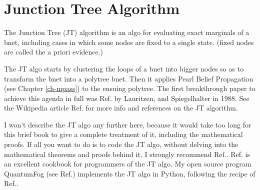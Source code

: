 \chapter{Junction Tree Algorithm}
\label{ch-junc-tree}
The Junction Tree (JT)
algorithm
is an algo
for evaluating
exact marginals
of a bnet, 
including cases in which
some nodes are fixed to a single state.
(fixed nodes
are called the a priori evidence.)

The JT algo
starts by  
clustering
the loops of a bnet into bigger nodes
so as  to
transform the bnet into a polytree bnet.
Then it applies
Pearl Belief Propagation (see
Chapter \ref{ch-mpass}) to the ensuing polytree.
The first breakthrough 
paper to achieve this agenda in full
was Ref.\cite{lauritzen1988}
by Lauritzen, and Spiegelhalter in 1988.
See the Wikipedia article 
Ref.\cite{wiki-junc-tree}
for more info and
 references on the JT algorithm. 

I won't describe
the JT algo
any further here,
because it would take too
long for this brief book
to give a complete treatment
of it, including the mathematical proofs.
If all you want to do is to
code the JT algo, without
delving into the mathematical theorems
and proofs behind it, I 
strongly recommend 
Ref.\cite{huang1996}.
Ref.\cite{huang1996} is 
an excellent cookbook
for programmers of the JT algo. My
open source  
program QuantumFog (see Ref.\cite{qfog})
implements the
JT algo in Python, 
following the recipe of
Ref.\cite{huang1996}.